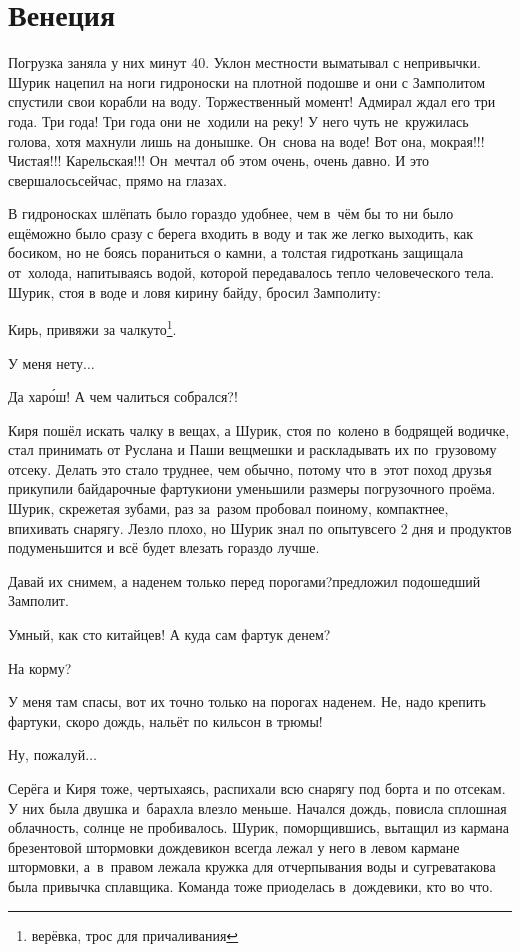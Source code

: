 \chapter{Венеция}
\vepsianrose

Погрузка заняла у них минут 40. Уклон местности выматывал с непривычки. Шурик нацепил на ноги гидроноски на плотной подошве и они с Замполитом спустили свои корабли на воду. Торжественный момент! Адмирал ждал его три года. Три года! Три года они не~ходили на реку! У него чуть не~кружилась голова, хотя махнули лишь на донышке. Он~снова на воде! Вот она, мокрая!!! Чистая!!! Карельская!!! Он~мечтал об этом очень, очень давно. И это свершалось\mdash сейчас, прямо на глазах.

В гидроносках шлёпать было гораздо удобнее, чем в~чём бы то ни было ещё\mdash можно было сразу с берега входить в воду и так же легко выходить, как босиком, но не боясь пораниться о камни, а толстая гидроткань защищала от~холода, напитываясь водой, которой передавалось тепло человеческого тела. Шурик, стоя в воде и ловя кирину байду, бросил Замполиту:

\mdash Кирь, привяжи за чалку\sdash то\footnote{верёвка, трос для причаливания}.

\mdash У меня нету$\ldots$

\mdash Да хар\'{о}ш! А чем чалиться собрался?!

Киря пошёл искать чалку в вещах, а Шурик, стоя по~колено в бодрящей водичке, стал принимать от Руслана и Паши вещмешки и раскладывать их по~грузовому отсеку. Делать это стало труднее, чем обычно, потому что в~этот поход друзья прикупили байдарочные фартуки\mdash они уменьшили размеры погрузочного проёма. Шурик, скрежетая зубами, раз за~разом пробовал по\sdash иному, компактнее, впихивать снарягу. Лезло плохо, но Шурик знал по опыту\mdash всего 2 дня и продуктов подуменьшится и всё будет влезать гораздо лучше.

\mdash Давай их снимем, а наденем только перед порогами?\mdash предложил подошедший Замполит. 

\mdash Умный, как сто китайцев! А куда сам фартук денем? 

\mdash На корму?

\mdash У меня там спасы, вот их точно только на порогах наденем. Не, надо крепить фартуки, скоро дождь, нальёт по кильсон в трюмы!

\mdash Ну, пожалуй$\ldots$

Серёга и Киря тоже, чертыхаясь, распихали всю снарягу под борта и по отсекам. У них была двушка и~барахла влезло меньше. Начался дождь, повисла сплошная облачность, солнце не пробивалось. Шурик, поморщившись, вытащил из кармана брезентовой штормовки дождевик\mdash он всегда лежал у него в левом кармане штормовки, а~в~правом лежала кружка для отчерпывания воды и сугрева\mdash такова была привычка сплавщика. Команда тоже приоделась в~дождевики, кто во что.

